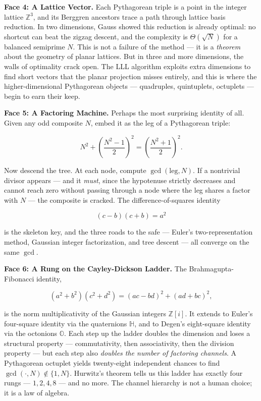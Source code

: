 \documentclass[12pt, letterpaper, openany]{book}
\theoremstyle{definition}
\theoremstyle{remark}
\begin{document}
\textbf{Face 4: A Lattice Vector.} Each Pythagorean triple is a point in the integer lattice $\mathbb{Z}^3$, and its Berggren ancestors trace a path through lattice basis reduction. In two dimensions, Gauss showed this reduction is already optimal: no shortcut can beat the zigzag descent, and the complexity is $\Theta(\sqrt{N})$ for a balanced semiprime $N$. This is not a failure of the method --- it is a \textit{theorem} about the geometry of planar lattices. But in three and more dimensions, the walls of optimality crack open. The LLL algorithm exploits extra dimensions to find short vectors that the planar projection misses entirely, and this is where the higher-dimensional Pythagorean objects --- quadruples, quintuplets, octuplets --- begin to earn their keep.

\textbf{Face 5: A Factoring Machine.} Perhaps the most surprising identity of all. Given any odd composite $N$, embed it as the leg of a Pythagorean triple:

\[
N^2 + \left(\frac{N^2 - 1}{2}\right)^{\!2} = \left(\frac{N^2 + 1}{2}\right)^{\!2}.
\]

Now descend the tree. At each node, compute $\gcd(\text{leg}, N)$. If a nontrivial divisor appears --- and it \textit{must}, since the hypotenuse strictly decreases and cannot reach zero without passing through a node where the leg shares a factor with $N$ --- the composite is cracked. The difference-of-squares identity

\[
(c - b)(c + b) = a^2
\]

is the skeleton key, and the three roads to the safe --- Euler's two-representation method, Gaussian integer factorization, and tree descent --- all converge on the same $\gcd$.

\textbf{Face 6: A Rung on the Cayley-Dickson Ladder.} The Brahmagupta-Fibonacci identity,

\[
(a^2 + b^2)(c^2 + d^2) = (ac - bd)^2 + (ad + bc)^2,
\]

is the norm multiplicativity of the Gaussian integers $\mathbb{Z}[i]$. It extends to Euler's four-square identity via the quaternions $\mathbb{H}$, and to Degen's eight-square identity via the octonions $\mathbb{O}$. Each step up the ladder doubles the dimension and loses a structural property --- commutativity, then associativity, then the division property --- but each step also \textit{doubles the number of factoring channels}. A Pythagorean octuplet yields twenty-eight independent chances to find $\gcd(\cdot, N) \notin \{1, N\}$. Hurwitz's theorem tells us this ladder has exactly four rungs --- $1, 2, 4, 8$ --- and no more. The channel hierarchy is not a human choice; it is a law of algebra.
\end{document}
